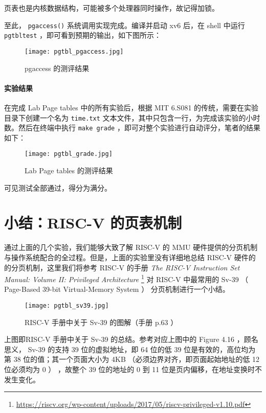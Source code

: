 \begin{theorem}[再次提醒加锁] 
    页表也是内核数据结构，可能被多个处理器同时操作，故记得加锁。
\end{theorem}

至此， \lstinline{pgaccess()} 系统调用实现完成。编译并启动 xv6 后，在 shell 中运行 \lstinline{pgtbltest} ，即可看到预期的输出，如下图所示：
\begin{figure}[H]
  \centering
  \texttt{[image: pgtbl\_pgaccess.jpg]}
  \caption{ pgaccess 的测评结果}
\end{figure}

\paragraph*{实验结果} 在完成 Lab Page tables 中的所有实验后，根据 MIT 6.S081 的传统，需要在实验目录下创建一个名为 \lstinline{time.txt} 文本文件，其中只包含一行，为完成该实验的小时数。然后在终端中执行 \lstinline{make grade} ，即可对整个实验进行自动评分，笔者的结果如下：
\begin{figure}[H]
  \centering
  \texttt{[image: pgtbl\_grade.jpg]}
  \caption{ Lab Page tables 的测评结果}
\end{figure}
可见测试全部通过，得分为满分。


\section{小结：RISC-V 的页表机制}

通过上面的几个实验，我们能够大致了解 RISC-V 的 MMU 硬件提供的分页机制与操作系统配合的全过程。但是，上面的实验里没有详细地总结 RISC-V 硬件的的分页机制，这里我们将参考 RISC-V 的手册 \textit{The RISC-V Instruction Set Manual: Volume II: Privileged Architecture} \footnote{\url{https://riscv.org/wp-content/uploads/2017/05/riscv-privileged-v1.10.pdf}} 对 RISC-V 中最常用的 Sv-39 （ Page-Based 39-bit Virtual-Memory System ） 分页机制进行一个小结。

\begin{figure}[H]
  \centering
  \texttt{[image: pgtbl\_sv39.jpg]}
  \caption{ RISC-V 手册中关于 Sv-39 的图解（手册 p.63 ） }
\end{figure}

上图即RISC-V 手册中关于 Sv-39 的总结。参考对应上图中的 Figure 4.16 ，顾名思义， Sv-39 的支持 39 位的虚拟地址，即 64 位的低 39 位是有效的，高位均为第 38 位的值；其一个页面大小为 4KB （必须边界对齐，即页面起始地址的低 12 位必须均为 0 ） ，故整个 39 位的地址的 0 到 11 位是页内偏移，在地址变换时不发生变化。

